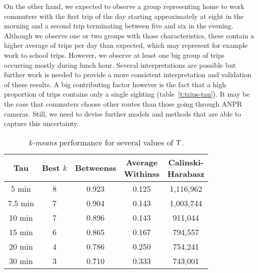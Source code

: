 On the other hand, we expected to observe a group representing home to work commuters with the first trip of the day starting approximately at eight in the morning and a second trip terminating between five and six in the evening. Although we observe one or two groups with those characteristics, these contain a higher average of trips per day than expected, which may represent for example work to school trips. However, we observe at least one big group of trips occurring mostly during lunch hour. Several interpretations are possible but further work is needed to provide a more consistent interpretation and validation of these results. A big contributing factor however is the fact that a high proportion of trips contains only a single sighting (table~\ref{t:trips-tau}). It may be the case that commuters choose other routes than those going through ANPR cameras. Still, we need to devise further models and methods that are able to capture this uncertainty.

\begin{table}[t]
\centering
\tabcolsep=0.17cm
\begin{tabular}{c c c c c}
  \hline
Tau & Best $k$ & Betweenss & \thead{Average\\Withinss} & \thead{Calinski-\\Harabasz} \\
  \hline
5 min &   8 & 0.923 & 0.125 & 1,116,962 \\
  7.5 min &   7 & 0.904 & 0.143 & 1,003,744 \\
  10 min&   7 & 0.896 & 0.143 &   911,044 \\
  15 min &   6 & 0.865 & 0.167 &   794,557 \\
  20 min &   4 & 0.786 & 0.250 &   754,241 \\
  30 min &   3 & 0.710 & 0.333 &   743,001 \\
   \hline
\end{tabular}
\caption{\emph{k-means} performance for several values of $\mathrm{T}$.}
\label{t:tau_comparison}
\vspace{-0.5cm}
\end{table}

